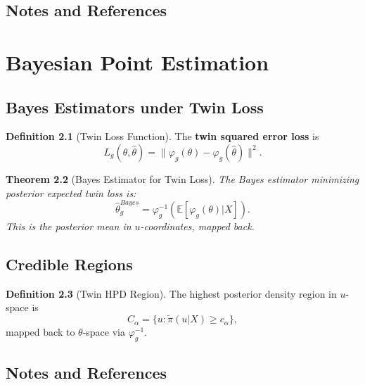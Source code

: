 \documentclass[11pt,twoside]{book}
\theoremstyle{plain}
\newtheorem{theorem}{Theorem}[chapter]
\theoremstyle{definition}
\newtheorem{definition}[theorem]{Definition}
\theoremstyle{remark}
\newcommand{\E}{\mathbb{E}}
\begin{document}
\section{Notes and References}
\label{sec:ch9_notes}


\chapter{Bayesian Point Estimation}
\label{ch:point_estimation}

\section{Bayes Estimators under Twin Loss}
\label{sec:bayes_estimators}

\begin{definition}[Twin Loss Function]
    The \textbf{twin squared error loss} is
    \[
    L_g(\theta, \hat{\theta}) = \|\varphi_g(\theta) - \varphi_g(\hat{\theta})\|^2.
    \]
\end{definition}

\begin{theorem}[Bayes Estimator for Twin Loss]
    The Bayes estimator minimizing posterior expected twin loss is:
    \[
    \hat{\theta}^{Bayes}_g = \varphi_g^{-1}\left(\E[\varphi_g(\theta) | X]\right).
    \]
    This is the posterior mean in $u$-coordinates, mapped back.
\end{theorem}

\section{Credible Regions}
\label{sec:credible}

\begin{definition}[Twin HPD Region]
    The highest posterior density region in $u$-space is
    \[
    C_\alpha = \{u : \tilde{\pi}(u | X) \geq c_\alpha\},
    \]
    mapped back to $\theta$-space via $\varphi_g^{-1}$.
\end{definition}

\section{Notes and References}
\label{sec:ch10_notes}
\end{document}
